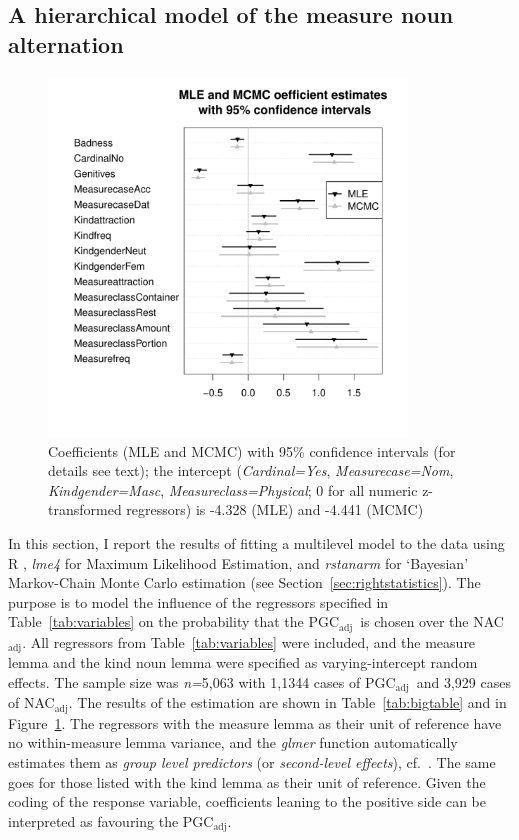 \documentclass[USenglish]{article}
\newcommand{\Sub}[1]{\ensuremath{\mathrm{_{#1}}}}
\newcommand{\NACa}{NAC\Sub{adj}}
\newcommand{\PGCa}{PGC\Sub{adj}}
\begin{document}
\subsection{A hierarchical model of the measure noun alternation}
\label{sec:corpushierarchicalmodel}

\begin{figure}[hb!]
  \centering
  \includegraphics[width=0.85\textwidth]{../R/output/corpus_fixeffs_mle+mcmc}
  \caption{Coefficients (MLE and MCMC) with 95\% confidence intervals (for details see text); the intercept (\textit{Cardinal=Yes}, \textit{Measurecase=Nom}, \textit{Kindgender=Masc}, \textit{Measureclass=Physical}; 0 for all numeric z-transformed regressors) is -4.328 (MLE) and -4.441 (MCMC)}
  \label{fig:fixeffs}
\end{figure}

In this section, I report the results of fitting a multilevel model to the data using R \citep{R}, \textit{lme4} \citep{lme4} for Maximum Likelihood Estimation, and \textit{rstanarm} \citep{rstanarm} for `Bayesian' Markov-Chain Monte Carlo estimation (see Section~\ref{sec:rightstatistics}).
The purpose is to model the influence of the regressors specified in Table~\ref{tab:variables} on the probability that the \PGCa\ is chosen over the \NACa.
All regressors from Table~\ref{tab:variables} were included, and the measure lemma and the kind noun lemma were specified as varying-intercept random effects.
The sample size was \textit{n=}5,063 with 1,1344 cases of \PGCa\ and 3,929 cases of \NACa.
The results of the estimation are shown in Table~\ref{tab:bigtable} and in Figure~\ref{fig:fixeffs}.
The regressors with the measure lemma as their unit of reference have no within-measure lemma variance, and the \textit{glmer} function automatically estimates them as \textit{group level predictors} (or \textit{second-level effects}), cf.\ \citet[265--269,302--304]{GelmanHill2006}.
The same goes for those listed with the kind lemma as their unit of reference.
Given the coding of the response variable, coefficients leaning to the positive side can be interpreted as favouring the \PGCa.
\end{document}
